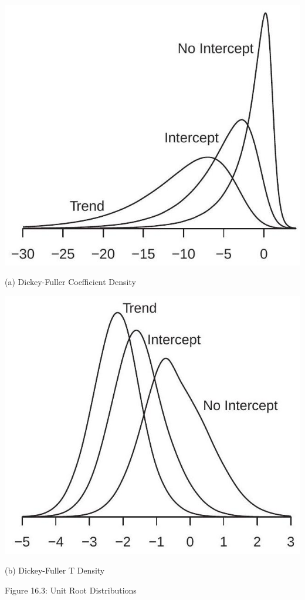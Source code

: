\documentclass[10pt]{article}
\begin{document}
\includegraphics[max width=\textwidth]{2022_10_23_e99fc7c58db661c6f219g-15}

(a) Dickey-Fuller Coefficient Density

\includegraphics[max width=\textwidth]{2022_10_23_e99fc7c58db661c6f219g-15(1)}

(b) Dickey-Fuller T Density

Figure 16.3: Unit Root Distributions
\end{document}
